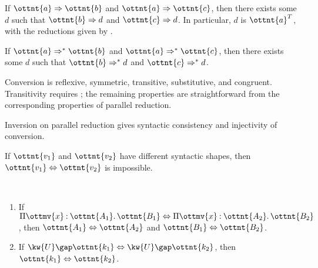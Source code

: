 \documentclass[a4paper,UKenglish,cleveref,autoref,thm-restate]{lipics-v2021}
\begin{document}
\begin{corollary}[Diamond (p.r.)] \label{lem:par:diamond}
  If $ \ottnt{a}  \Rightarrow  \ottnt{b} $ and $ \ottnt{a}  \Rightarrow  \ottnt{c} $,
  then there exists some $d$ such that $ \ottnt{b}  \Rightarrow  d $ and $ \ottnt{c}  \Rightarrow  d $.
  In particular, $d$ is $ \ottnt{a} ^{ \mathsf{T} } $,
  with the reductions given by .
\end{corollary}

\begin{theorem}[Confluence (p.r.)] \label{lem:par:confl}
  If $ \ottnt{a}  \Rightarrow^\ast  \ottnt{b} $ and $ \ottnt{a}  \Rightarrow^\ast  \ottnt{c} $,
  then there exists some $d$ such that $ \ottnt{b}  \Rightarrow^\ast  d $ and $ \ottnt{c}  \Rightarrow^\ast  d $.
\end{theorem}

\begin{corollary} \label{lem:conv}
  Conversion is reflexive, symmetric, transitive, substitutive, and congruent.
  Transitivity requires ;
  the remaining properties are straightforward
  from the corresponding properties of parallel reduction.
\end{corollary}

Inversion on parallel reduction gives syntactic consistency and injectivity of conversion.

\begin{lemma} \label{lem:par:consistency}
  If $\ottnt{v_{{\mathrm{1}}}}$ and $\ottnt{v_{{\mathrm{2}}}}$ have different syntactic shapes,
  then $ \ottnt{v_{{\mathrm{1}}}}  \Leftrightarrow  \ottnt{v_{{\mathrm{2}}}} $ is impossible.
\end{lemma}

\begin{lemma} ~
  \begin{enumerate}[topsep=0pt]
    \item If $  \Pi  \ottmv{x}  \mathbin{:}  \ottnt{A_{{\mathrm{1}}}}  \mathpunct{.}  \ottnt{B_{{\mathrm{1}}}}   \Leftrightarrow   \Pi  \ottmv{x}  \mathbin{:}  \ottnt{A_{{\mathrm{2}}}}  \mathpunct{.}  \ottnt{B_{{\mathrm{2}}}}  $, then $ \ottnt{A_{{\mathrm{1}}}}  \Leftrightarrow  \ottnt{A_{{\mathrm{2}}}} $ and $ \ottnt{B_{{\mathrm{1}}}}  \Leftrightarrow  \ottnt{B_{{\mathrm{2}}}} $.
    \item If $  \kw{U} \gap  \ottnt{k_{{\mathrm{1}}}}   \Leftrightarrow   \kw{U} \gap  \ottnt{k_{{\mathrm{2}}}}  $, then $ \ottnt{k_{{\mathrm{1}}}}  \Leftrightarrow  \ottnt{k_{{\mathrm{2}}}} $.
  \end{enumerate}
\end{lemma}
\end{document}
